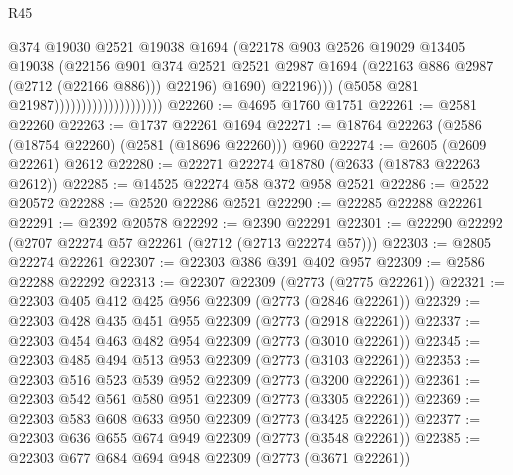 \begin{lexlean}{R45}
\begin{coremodule}
                                                @374
                                                @19030
                                                @2521
                                                @19038
                                                @1694
                                                (@22178
                                                  @903
                                                  @2526
                                                  @19029
                                                  @13405
                                                  @19038
                                                  (@22156
                                                    @901
                                                    @374
                                                    @2521
                                                    @2521
                                                    @2987
                                                    @1694
                                                    (@22163 @886 @2987 (@2712 (@22166 @886)))
                                                    @22196)
                                                  @1690)
                                                @22196)))
                                          (@5058 @281 @21987))))))))))))))))))))
@22260 := @4695 @1760 @1751
@22261 := @2581 @22260
@22263 := @1737 @22261 @1694
@22271 := @18764 @22263 (@2586 (@18754 @22260) (@2581 (@18696 @22260))) @960
@22274 := @2605 (@2609 @22261) @2612
@22280 := @22271 @22274 @18780 (@2633 (@18783 @22263 @2612))
@22285 := @14525 @22274 @58 @372 @958 @2521
@22286 := @2522 @20572
@22288 := @2520 @22286 @2521
@22290 := @22285 @22288 @22261
@22291 := @2392 @20578
@22292 := @2390 @22291
@22301 := @22290 @22292 (@2707 @22274 @57 @22261 (@2712 (@2713 @22274 @57)))
@22303 := @2805 @22274 @22261
@22307 := @22303 @386 @391 @402 @957
@22309 := @2586 @22288 @22292
@22313 := @22307 @22309 (@2773 (@2775 @22261))
@22321 := @22303 @405 @412 @425 @956 @22309 (@2773 (@2846 @22261))
@22329 := @22303 @428 @435 @451 @955 @22309 (@2773 (@2918 @22261))
@22337 := @22303 @454 @463 @482 @954 @22309 (@2773 (@3010 @22261))
@22345 := @22303 @485 @494 @513 @953 @22309 (@2773 (@3103 @22261))
@22353 := @22303 @516 @523 @539 @952 @22309 (@2773 (@3200 @22261))
@22361 := @22303 @542 @561 @580 @951 @22309 (@2773 (@3305 @22261))
@22369 := @22303 @583 @608 @633 @950 @22309 (@2773 (@3425 @22261))
@22377 := @22303 @636 @655 @674 @949 @22309 (@2773 (@3548 @22261))
@22385 := @22303 @677 @684 @694 @948 @22309 (@2773 (@3671 @22261))

\end{coremodule}
\end{lexlean}
